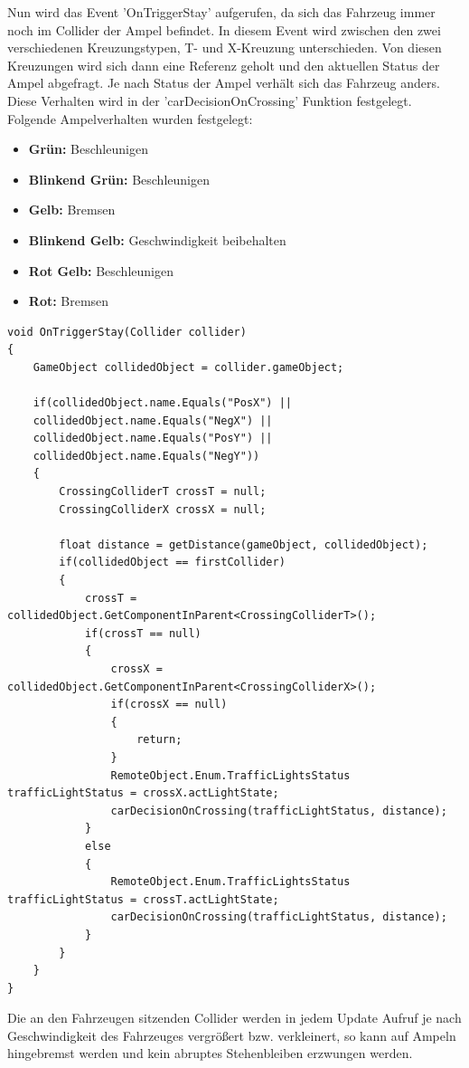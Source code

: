 Nun wird das Event 'OnTriggerStay' aufgerufen, da sich das Fahrzeug immer noch im Collider der Ampel befindet. In diesem Event wird zwischen den zwei verschiedenen Kreuzungstypen, T- und X-Kreuzung unterschieden. Von diesen Kreuzungen wird sich dann eine Referenz geholt und den aktuellen Status der Ampel abgefragt. Je nach Status der Ampel verhält sich das Fahrzeug anders. Diese Verhalten wird in der 'carDecisionOnCrossing' Funktion festgelegt. Folgende Ampelverhalten wurden festgelegt:

\begin{itemize}  
\item \textbf{Grün:} Beschleunigen
\item \textbf{Blinkend Grün:} Beschleunigen
\item \textbf{Gelb:} Bremsen
\item \textbf{Blinkend Gelb:} Geschwindigkeit beibehalten
\item \textbf{Rot Gelb:} Beschleunigen
\item \textbf{Rot:} Bremsen
\end{itemize}

\begin{lstlisting}[caption={Bestehende Kollision mit Ampelcollider},label={lst:ampel_decision}]
void OnTriggerStay(Collider collider)
{
	GameObject collidedObject = collider.gameObject;

	if(collidedObject.name.Equals("PosX") ||
	collidedObject.name.Equals("NegX") ||
	collidedObject.name.Equals("PosY") ||
	collidedObject.name.Equals("NegY"))
	{
		CrossingColliderT crossT = null;
		CrossingColliderX crossX = null;

		float distance = getDistance(gameObject, collidedObject);
		if(collidedObject == firstCollider)
		{
			crossT = collidedObject.GetComponentInParent<CrossingColliderT>();
			if(crossT == null)
			{
				crossX = collidedObject.GetComponentInParent<CrossingColliderX>();
				if(crossX == null)
				{
					return;
				}
				RemoteObject.Enum.TrafficLightsStatus trafficLightStatus = crossX.actLightState;
				carDecisionOnCrossing(trafficLightStatus, distance);
			}
			else
			{
				RemoteObject.Enum.TrafficLightsStatus trafficLightStatus = crossT.actLightState;
				carDecisionOnCrossing(trafficLightStatus, distance);
			}
		}
	}
}
\end{lstlisting}

Die an den Fahrzeugen sitzenden Collider werden in jedem Update Aufruf je nach Geschwindigkeit des Fahrzeuges vergrößert bzw. verkleinert, so kann auf Ampeln hingebremst werden und kein abruptes Stehenbleiben erzwungen werden.

